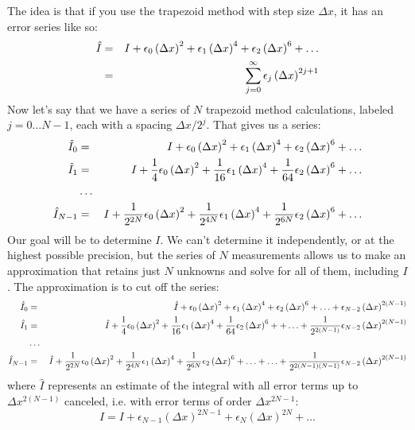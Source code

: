 The idea is that if you use the trapezoid method with step size
$\Delta x$, it has an error series like so:
\begin{eqnarray}
\hat I &=& I + \epsilon_0 \left(\Delta x\right)^2 + 
\epsilon_1 \left(\Delta x\right)^4 + 
\epsilon_2 \left(\Delta x\right)^6 + \ldots \cr
&=& \sum_{j=0}^{\infty} \epsilon_j \left(\Delta x\right)^{2j+1}
\end{eqnarray}
Now let's say that we have a series of $N$ trapezoid method
calculations, labeled $j=0\ldots N-1$, each with a spacing $\Delta x /
2^j$. That gives us a series:
\begin{eqnarray}
\hat I_0 &=& I + \epsilon_0 \left(\Delta x\right)^2 + 
\epsilon_1 \left(\Delta x\right)^4 + 
\epsilon_2 \left(\Delta x\right)^6 + \ldots \cr
\hat I_1 &=& I + \frac{1}{4} \epsilon_0 \left(\Delta x\right)^2 + 
\frac{1}{16} \epsilon_1 \left(\Delta x\right)^4 + 
\frac{1}{64} \epsilon_2 \left(\Delta x\right)^6 + \ldots \cr
&\ldots& \cr
\hat I_{N-1} &=& I + \frac{1}{2^{2N}} \epsilon_0 \left(\Delta x\right)^2 + 
\frac{1}{2^{4N}} \epsilon_1 \left(\Delta x\right)^4 + 
\frac{1}{2^{6N}} \epsilon_2 \left(\Delta x\right)^6 + \ldots
\end{eqnarray}
Our goal will be to determine $I$. We can't determine it
independently, or at the highest possible precision, but the series of
$N$ measurements allows us to make an approximation that retains just
$N$ unknowns and solve for all of them, including $I$. The
approximation is to cut off the series:
\begin{eqnarray}
\hat I_0 &=& \hat I + \epsilon_0 \left(\Delta x\right)^2 + 
\epsilon_1 \left(\Delta x\right)^4 + 
\epsilon_2 \left(\Delta x\right)^6
+ \ldots + \epsilon_{N-2} \left(\Delta x \right)^{2(N-1)}\cr
\hat I_1 &=& \hat I + \frac{1}{4} \epsilon_0 \left(\Delta x\right)^2 + 
\frac{1}{16} \epsilon_1 \left(\Delta x\right)^4 + 
\frac{1}{64} \epsilon_2 \left(\Delta x\right)^6 + 
+ \ldots + \frac{1}{2^{2(N-1)}} \epsilon_{N-2} \left(\Delta x \right)^{2(N-1)}\cr
&\ldots& \cr
\hat I_{N-1} &=& \hat I + \frac{1}{2^{2N}} \epsilon_0 \left(\Delta x\right)^2 + 
\frac{1}{2^{4N}} \epsilon_1 \left(\Delta x\right)^4 + 
\frac{1}{2^{6N}} \epsilon_2 \left(\Delta x\right)^6 + \ldots
+ \ldots + \frac{1}{2^{2(N-1)(N-1)}} \epsilon_{N-2} \left(\Delta x \right)^{2(N-1)}
\end{eqnarray}
where $\hat I$ represents an estimate of the integral with all error
terms up to $\Delta x^{2(N-1)}$ canceled, i.e. with error terms of
order $\Delta x^{2N-1}$: 
\begin{equation}
\hat I = I + \epsilon_{N-1} \left(\Delta x\right)^{2N-1}
+ \epsilon_{N} \left(\Delta x\right)^{2N} + \ldots
\end{equation}
